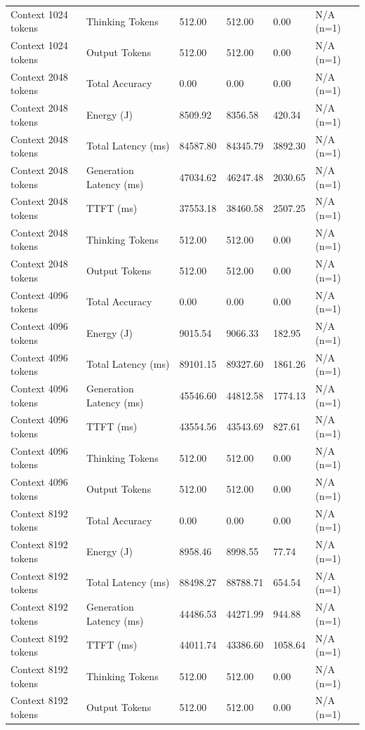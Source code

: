 \begin{table}
\begin{tabular}{llllll}
Context 1024 tokens & Thinking Tokens & 512.00 & 512.00 & 0.00 & N/A (n=1) \\
Context 1024 tokens & Output Tokens & 512.00 & 512.00 & 0.00 & N/A (n=1) \\
Context 2048 tokens & Total Accuracy & 0.00 & 0.00 & 0.00 & N/A (n=1) \\
Context 2048 tokens & Energy (J) & 8509.92 & 8356.58 & 420.34 & N/A (n=1) \\
Context 2048 tokens & Total Latency (ms) & 84587.80 & 84345.79 & 3892.30 & N/A (n=1) \\
Context 2048 tokens & Generation Latency (ms) & 47034.62 & 46247.48 & 2030.65 & N/A (n=1) \\
Context 2048 tokens & TTFT (ms) & 37553.18 & 38460.58 & 2507.25 & N/A (n=1) \\
Context 2048 tokens & Thinking Tokens & 512.00 & 512.00 & 0.00 & N/A (n=1) \\
Context 2048 tokens & Output Tokens & 512.00 & 512.00 & 0.00 & N/A (n=1) \\
Context 4096 tokens & Total Accuracy & 0.00 & 0.00 & 0.00 & N/A (n=1) \\
Context 4096 tokens & Energy (J) & 9015.54 & 9066.33 & 182.95 & N/A (n=1) \\
Context 4096 tokens & Total Latency (ms) & 89101.15 & 89327.60 & 1861.26 & N/A (n=1) \\
Context 4096 tokens & Generation Latency (ms) & 45546.60 & 44812.58 & 1774.13 & N/A (n=1) \\
Context 4096 tokens & TTFT (ms) & 43554.56 & 43543.69 & 827.61 & N/A (n=1) \\
Context 4096 tokens & Thinking Tokens & 512.00 & 512.00 & 0.00 & N/A (n=1) \\
Context 4096 tokens & Output Tokens & 512.00 & 512.00 & 0.00 & N/A (n=1) \\
Context 8192 tokens & Total Accuracy & 0.00 & 0.00 & 0.00 & N/A (n=1) \\
Context 8192 tokens & Energy (J) & 8958.46 & 8998.55 & 77.74 & N/A (n=1) \\
Context 8192 tokens & Total Latency (ms) & 88498.27 & 88788.71 & 654.54 & N/A (n=1) \\
Context 8192 tokens & Generation Latency (ms) & 44486.53 & 44271.99 & 944.88 & N/A (n=1) \\
Context 8192 tokens & TTFT (ms) & 44011.74 & 43386.60 & 1058.64 & N/A (n=1) \\
Context 8192 tokens & Thinking Tokens & 512.00 & 512.00 & 0.00 & N/A (n=1) \\
Context 8192 tokens & Output Tokens & 512.00 & 512.00 & 0.00 & N/A (n=1) \\
\bottomrule
\end{tabular}
\end{table}
